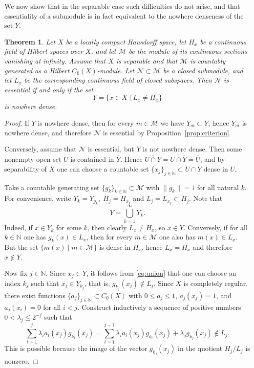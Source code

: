 \documentclass[reqno,a4paper,12pt]{amsart}
\theoremstyle{plain}
\newtheorem{theorem}{Theorem}[section]
\theoremstyle{definition}
\newcommand{\NN}{\mathbb N}
\newcommand{\M}{\mathcal M}
\newcommand{\N}{\mathcal N}
\renewcommand{\leq}{\leqslant}
\begin{document}
	We now show that in the separable case such difficulties do not arise, and that essentiality of a submodule is in fact equivalent to the nowhere denseness of the set $Y$.
	\begin{theorem}
		\label{thm:criterion}
		Let $X$ be a locally compact Hausdorff space, let $H_x$ be a continuous field of Hilbert spaces over $X$, and let $\M$ be the module of its continuous sections vanishing at infinity.
		Assume that $X$ is separable and that $\M$ is countably generated as a Hilbert $C_0(X)$-module.
		Let $\N \subset \M$ be a closed submodule, and let $L_x$ be the corresponding continuous field of closed subspaces.
		Then $\N$ is essential if and only if the set 
		\[Y = \{x \in X \mid L_x \ne H_x\}\]
		is nowhere dense.
	\end{theorem}
	\begin{proof}
		If $Y$ is nowhere dense, then for every $m \in \M$ we have $Y_m \subset Y$, hence $Y_m$ is nowhere dense, and therefore $\N$ is essential by Proposition~\ref{prop:criterion}.
		
		Conversely, assume that $\N$ is essential, but $Y$ is not nowhere dense. Then some nonempty open set $U$ is contained in $\overline Y$.
		Hence $\overline{U \cap Y} = \overline{U \cap \overline Y} = \overline U$, and by separability of $X$ one can choose a countable set $\{x_j\}_{j \in \NN} \subset U \cap Y$ dense in $U$.
		
		Take a countable generating set $\{g_k\}_{k \in \NN} \subset \M$ with $\|g_k\| = 1$ for all natural $k$.
		For convenience, write $Y_k = Y_{g_k},\; H_j = H_{x_j}$ and $L_j = L_{x_j} \subset H_j$.
		Note that
		\begin{equation}
			\label{eq:union}
			Y = \bigcup_{k=1}^\infty Y_k.
		\end{equation}
		Indeed, if $x \in Y_k$ for some $k$, then clearly $L_x \ne H_x$, so $x \in Y$.
		Conversely, if for all $k \in \NN$ one has $g_k(x) \in L_x$, then for every $m \in \M$ one also has $m(x) \in L_x$.
		But the set $\{m(x) \mid m \in \M\}$ is dense in $H_x$, hence $L_x = H_x$ and therefore $x \notin Y$.
		
		Now fix $j \in \NN$. Since $x_j \in Y$, it follows from \eqref{eq:union} that one can choose an index $k_j$ such that $x_j \in Y_{k_j}$, that is, $g_{k_j}(x_j) \notin L_j$.
		Since $X$ is completely regular, there exist functions $\{a_j\}_{j \in \NN} \subset C_0(X)$ with $0 \leq a_j \leq 1$, $a_j(x_j) = 1$, and $a_j(x_i) = 0$ for all $i < j$.
		Construct inductively a sequence of positive numbers $0 < \lambda_j \leq 2^{-j}$ such that
		\begin{equation}
			\label{eq:induction}
			\sum_{i=1}^j\lambda_ia_i(x_j)g_{k_i}(x_j) = \sum_{i=1}^{j-1}\lambda_ia_i(x_j)g_{k_i}(x_j) + \lambda_jg_{k_j}(x_j) \notin L_j. 
		\end{equation}
		This is possible because the image of the vector $g_{k_j}(x_j)$ in the quotient $H_j / L_j$ is nonzero.
		

\end{proof}
\end{document}
